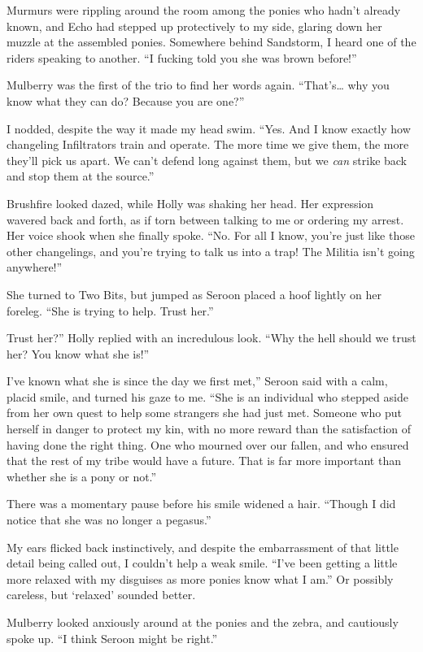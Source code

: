Murmurs were rippling around the room among the ponies who hadn’t already known, and Echo had stepped up protectively to my side, glaring down her muzzle at the assembled ponies. Somewhere behind Sandstorm, I heard one of the riders speaking to another. “I fucking told you she was brown before!”

Mulberry was the first of the trio to find her words again. “That’s… why you know what they can do? Because you are one?”

I nodded, despite the way it made my head swim. “Yes. And I know exactly how changeling Infiltrators train and operate. The more time we give them, the more they’ll pick us apart. We can’t defend long against them, but we \textit{can} strike back and stop them at the source.”

Brushfire looked dazed, while Holly was shaking her head. Her expression wavered back and forth, as if torn between talking to me or ordering my arrest. Her voice shook when she finally spoke. “No. For all I know, you’re just like those other changelings, and you’re trying to talk us into a trap! The Militia isn’t going anywhere!”

She turned to Two Bits, but jumped as Seroon placed a hoof lightly on her foreleg. “She is trying to help. Trust her.”

\leavevmode{}Trust her?” Holly replied with an incredulous look. “Why the hell should we trust her? You know what she is!”

\leavevmode{}I’ve known what she is since the day we first met,” Seroon said with a calm, placid smile, and turned his gaze to me. “She is an individual who stepped aside from her own quest to help some strangers she had just met. Someone who put herself in danger to protect my kin, with no more reward than the satisfaction of having done the right thing. One who mourned over our fallen, and who ensured that the rest of my tribe would have a future. That is far more important than whether she is a pony or not.”

There was a momentary pause before his smile widened a hair. “Though I did notice that she was no longer a pegasus.”

My ears flicked back instinctively, and despite the embarrassment of that little detail being called out, I couldn’t help a weak smile. “I’ve been getting a little more relaxed with my disguises as more ponies know what I am.” Or possibly careless, but ‘relaxed’ sounded better.

Mulberry looked anxiously around at the ponies and the zebra, and cautiously spoke up. “I think Seroon might be right.”

